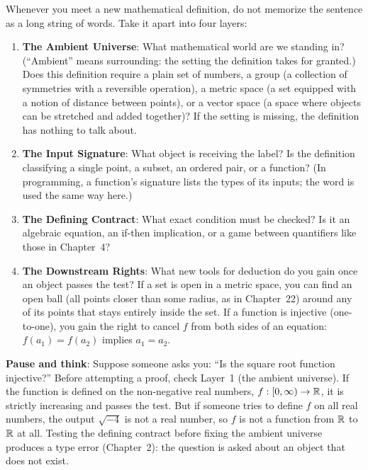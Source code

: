 Whenever you meet a new mathematical definition, do not memorize the sentence as a long string of words. Take it apart into four layers:

\begin{enumerate}
\item \textbf{The Ambient Universe}: What mathematical world are we standing in? (``Ambient'' means surrounding: the setting the definition takes for granted.) Does this definition require a plain set of numbers, a group (a collection of symmetries with a reversible operation), a metric space (a set equipped with a notion of distance between points), or a vector space (a space where objects can be stretched and added together)? If the setting is missing, the definition has nothing to talk about.
\item \textbf{The Input Signature}: What object is receiving the label? Is the definition classifying a single point, a subset, an ordered pair, or a function? (In programming, a function's signature lists the types of its inputs; the word is used the same way here.)
\item \textbf{The Defining Contract}: What exact condition must be checked? Is it an algebraic equation, an if-then implication, or a game between quantifiers like those in Chapter~4?
\item \textbf{The Downstream Rights}: What new tools for deduction do you gain once an object passes the test? If a set is open in a metric space, you can find an open ball (all points closer than some radius, as in Chapter~22) around any of its points that stays entirely inside the set. If a function is injective (one-to-one), you gain the right to cancel $f$ from both sides of an equation: $f(a_1) = f(a_2)$ implies $a_1 = a_2$.
\end{enumerate}

\begin{recoverybox}
\textbf{Pause and think}: Suppose someone asks you: ``Is the square root function injective?'' Before attempting a proof, check Layer~1 (the ambient universe). If the function is defined on the non-negative real numbers, $f: [0, \infty) \to \mathbb{R}$, it is strictly increasing and passes the test. But if someone tries to define $f$ on all real numbers, the output $\sqrt{-4}$ is not a real number, so $f$ is not a function from $\mathbb{R}$ to $\mathbb{R}$ at all. Testing the defining contract before fixing the ambient universe produces a type error (Chapter~2): the question is asked about an object that does not exist.
\end{recoverybox}

